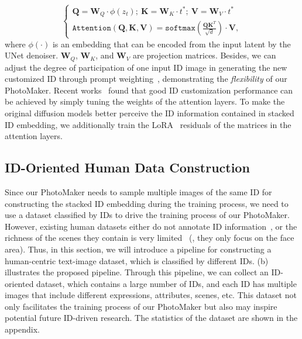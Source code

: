 \begin{equation}
\left \{
\begin{array}{ll}
    \mathbf{Q} = \mathbf{W}_Q\cdot \phi(z_t);\ \mathbf{K} = \mathbf{W}_K\cdot t^{*};\ \mathbf{V} = \mathbf{W}_V\cdot t^{*}\\
    \mathtt{Attention}(\mathbf{Q}, \mathbf{K}, \mathbf{V}) = \mathtt{softmax}(\frac{\mathbf{Q}\mathbf{K}^T}{\sqrt{d}})\cdot \mathbf{V},
\end{array}
\right.
\label{eq:cross-attn}
\end{equation}
where $\phi(\cdot)$ is an embedding that can be encoded from the input latent by the UNet denoiser. $\mathbf{W}_Q$, $\mathbf{W}_K$, and $\mathbf{W}_V$ are projection matrices.
Besides, we can adjust the degree of participation of one input ID image in generating the new customized ID through prompt weighting~\cite{hertz2022prompt, prompt_weighting}, demonstrating the \textit{flexibility} of our PhotoMaker.
Recent works~\cite{kumari2022multi, db_lora} found that good ID customization performance can be achieved by simply tuning the weights of the attention layers.
To make the original diffusion models better perceive the ID information contained in stacked ID embedding, we additionally train the LoRA~\cite{hu2021lora, db_lora}  residuals of the matrices in the attention layers.

\subsection{ID-Oriented Human Data Construction}
\label{sec:data_pipeline}

Since our PhotoMaker needs to sample multiple images of the same ID for constructing the stacked ID embedding during the training process, we need to use a dataset classified by IDs to drive the training process of our PhotoMaker.
However, existing human datasets either do not annotate ID information~\cite{karras2019style, schuhmann2022laion, zheng2022general, liu2023hyperhuman}, or the richness of the scenes they contain is very limited~\cite{liu2015faceattributes, kaisiyuan2020mead, nitzan2022mystyle} (\ie, they only focus on the face area).
Thus, in this section, we will introduce a pipeline for constructing a human-centric text-image dataset, which is classified by different IDs. 
(b) illustrates the proposed pipeline.
Through this pipeline, we can collect an ID-oriented dataset, which contains a large number of IDs, and each ID has multiple images that include different expressions, attributes, scenes, etc. 
This dataset not only facilitates the training process of our PhotoMaker but also may inspire potential future ID-driven research.
The statistics of the dataset are shown in the appendix.

